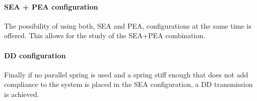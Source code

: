 \paragraph{SEA + PEA configuration} %
\label{ssub:sea_pea_configuration}
The possibility of using both, SEA and PEA, configurations at the same time is offered.
This allows for the study of the SEA+PEA combination.

\paragraph{DD configuration } %
\label{ssub:dd_configuration}
Finally if no parallel spring is used and a spring stiff enough that does not add compliance to the system is placed in the SEA configuration, a DD transmission is achieved.



